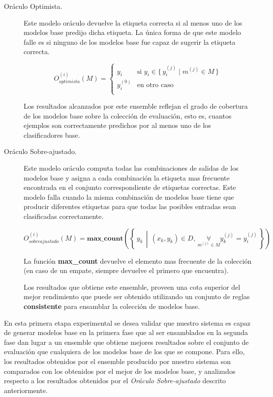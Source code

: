 \begin{description}

\item[Oráculo Optimista.]
Este modelo oráculo devuelve la etiqueta correcta si al menos uno de los modelos base predijo dicha etiqueta.
La única forma de que este modelo falle es si ninguno de los modelos base fue capaz de sugerir la etiqueta correcta.

\begin{equation*}
O_{optimista}^{(i)}(M) =
    \begin{cases}
        y_i & \textrm{si $y_i \in \{\,y^{(j)}_i \mid m^{(j)} \in M \,\}$} \\
        y^{(0)}_i & \textrm{en otro caso} \\
    \end{cases}
\end{equation*}

Los resultados alcanzados por este ensemble reflejan el grado de cobertura de los modelos base sobre la colección de evaluación, esto es, cuantos ejemplos son correctamente predichos por al menos uno de los clasificadores base.

\item[Oráculo Sobre-ajustado.]
Este modelo oráculo computa todas las combinaciones de salidas de los modelos base y asigna a cada combinación la etiqueta mas frecuente encontrada en el conjunto correspondiente de etiquetas correctas.
Este modelo falla cuando la misma combinación de modelos base tiene que producir diferentes etiquetas para que todas las posibles entradas sean clasificadas correctamente.

\begin{equation*}
O_{sobreajustado}^{(i)}(M) =
    \textbf{max\_count}\left(\left\{\, y_k \,\middle\vert\, (x_k, y_k) \in D, \, \underset{m^{(j)} \in M}{\forall} y^{(j)}_k = y^{(j)}_i \,\right\}\right)
\end{equation*}

La función \textbf{max\_count} devuelve el elemento mas frecuente de la colección (en caso de un empate, siempre devuelve el primero que encuentra).

Los resultados que obtiene este ensemble, proveen una cota superior del mejor rendimiento que puede ser obtenido utilizando un conjunto de reglas \textbf{consistente} para ensamblar la colección de modelos base.

\end{description}

En esta primera etapa experimental se desea validar que nuestro sistema es capaz de generar modelos base en la primera fase que al ser ensamblados en la segunda fase dan lugar a un ensemble que obtiene mejores resultados sobre el conjunto de evaluación que cualquiera de los modelos base de los que se compone.
Para ello, los resultados obtenidos por el ensemble producido por nuestro sistema son comparados con los obtenidos por el mejor de los modelos base, y analizados respecto a los resultados obtenidos por el \emph{Oráculo Sobre-ajustado} descrito anteriormente.

